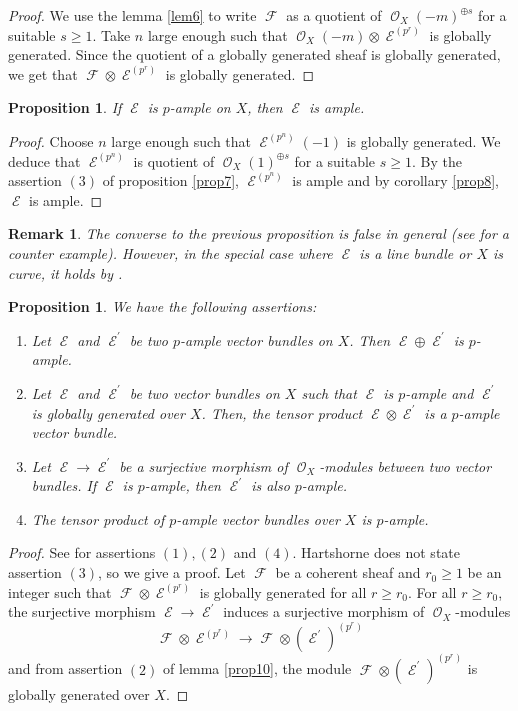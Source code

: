 \documentclass[11pt]{amsart}
\numberwithin{subsection}{section}
\numberwithin{figure}{section}
\numberwithin{table}{section}
\theoremstyle{1}
\newtheorem{proposition}[theorem]{Proposition}
\theoremstyle{2}
\newtheorem{rmrk}[theorem]{Remark}
\DeclareMathOperator{\Fc}{\mathcal{F}}
\DeclareMathOperator{\E}{\mathcal{E}}
\DeclareMathOperator{\Oc}{\mathcal{O}}
\begin{document}
\begin{proof}
We use the lemma \ref{lem6} to write $\Fc$ as a quotient of $\Oc_X(-m)^{\oplus s}$ for a suitable $s \geq 1$. Take $n$ large enough such that $\Oc_X(-m) \otimes \E^{(p^r)}$ is globally generated. Since the quotient of a globally generated sheaf is globally generated, we get that $\Fc \otimes \E^{(p^r)}$ is globally generated.
\end{proof}
\begin{proposition}\label{pamptoamp}
If $\E$ is $p$-ample on $X$, then $\E$ is ample. 
\end{proposition}
\begin{proof}
Choose $n$ large enough such that $\E^{(p^n)}(-1)$ is globally generated. We deduce that $\E^{(p^n)}$ is quotient of $\Oc_X(1)^{\oplus s}$ for a suitable $s\geq 1$. By the assertion $(3)$ of proposition \ref{prop7}, $\E^{(p^n)}$ is ample and by corollary \ref{prop8}, $\E$ is ample.
\end{proof}
\begin{rmrk}
The converse to the previous proposition is false in general (see \cite{MR296078} for a counter example). However, in the special case where $\E$ is a line bundle or $X$ is curve, it holds by \cite[Proposition 7.3]{MR193092}.
\end{rmrk}
\begin{proposition}\label{prop12}
We have the following assertions:
\begin{enumerate}
\item Let $\E$ and $\E^\prime$ be two $p$-ample vector bundles on $X$. Then $\E \oplus \E^\prime$ is $p$-ample.
\item Let $\E$ and $\E^\prime$ be two vector bundles on $X$ such that $\E$ is $p$-ample and $\E^\prime$ is globally generated over $X$. Then, the tensor product $\E \otimes \E^\prime$ is a $p$-ample vector bundle.
\item Let $\E \rightarrow \E^\prime$ be a surjective morphism of $\Oc_X$-modules between two vector bundles. If $\E$ is $p$-ample, then $\E^\prime$ is also $p$-ample.
\item The tensor product of $p$-ample vector bundles over $X$ is $p$-ample. 
\end{enumerate}
\end{proposition}
\begin{proof}
See \cite[Proposition 6.4/Corollary 6.7]{MR193092} for assertions $(1),(2)$ and $(4)$. Hartshorne does not state assertion $(3)$, so we give a proof. Let $\Fc$ be a coherent sheaf and $r_0 \geq 1$ be an integer such that $\Fc \otimes \E^{(p^r)}$ is globally generated for all $r \geq r_0$. For all $r \geq r_0$, the surjective morphism $\E \rightarrow \E^\prime$ induces a surjective morphism of $\Oc_X$-modules
\begin{equation*}
\Fc \otimes \E^{(p^r)}\rightarrow \Fc \otimes {(\E^\prime)}^{(p^r)}
\end{equation*}
and from assertion $(2)$ of lemma \ref{prop10}, the module $\Fc \otimes {(\E^\prime)}^{(p^r)}$ is globally generated over $X$.
\end{proof}
\end{document}
